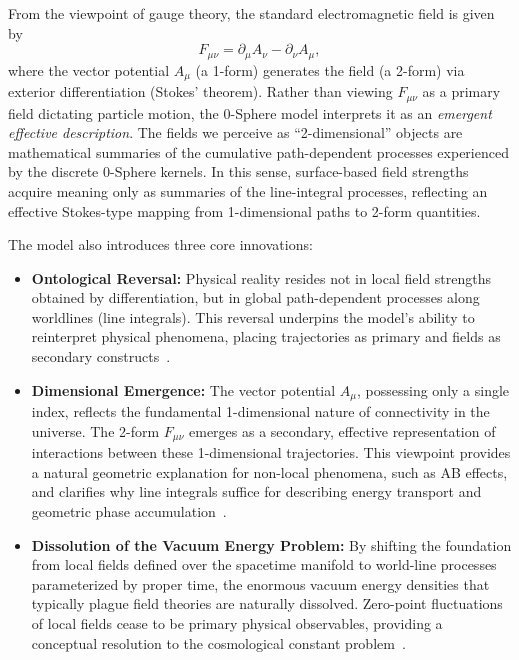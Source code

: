 \documentclass[%
 reprint,
 amsmath,amssymb,
 aps,
 prb,
]{revtex4-2}
\numberwithin{equation}{section}
\begin{document}
From the viewpoint of gauge theory, the standard electromagnetic field is given by
\begin{equation}
F_{\mu\nu} = \partial_\mu A_\nu - \partial_\nu A_\mu,
\end{equation}
where the vector potential $A_\mu$ (a 1-form) generates the field (a 2-form) via exterior differentiation (Stokes' theorem). 
Rather than viewing $F_{\mu\nu}$ as a primary field dictating particle motion, the 0-Sphere model interprets it as an \emph{emergent effective description}. 
The fields we perceive as ``2-dimensional'' objects are mathematical summaries of the cumulative path-dependent processes experienced by the discrete 0-Sphere kernels. 
In this sense, surface-based field strengths acquire meaning only as summaries of the line-integral processes, reflecting an effective Stokes-type mapping from 1-dimensional paths to 2-form quantities.

\medskip
The model also introduces three core innovations:

\begin{itemize}
    \item \textbf{Ontological Reversal:} Physical reality resides not in local field strengths obtained by differentiation, but in global path-dependent processes along worldlines (line integrals). 
    This reversal underpins the model’s ability to reinterpret physical phenomena, placing trajectories as primary and fields as secondary constructs~\cite{hanamura18135855}.

    \item \textbf{Dimensional Emergence:} The vector potential $A_\mu$, possessing only a single index, reflects the fundamental 1-dimensional nature of connectivity in the universe. 
    The 2-form $F_{\mu\nu}$ emerges as a secondary, effective representation of interactions between these 1-dimensional trajectories. 
    This viewpoint provides a natural geometric explanation for non-local phenomena, such as AB effects, and clarifies why line integrals suffice for describing energy transport and geometric phase accumulation~\cite{hanamura18203433}.
        
    \item \textbf{Dissolution of the Vacuum Energy Problem:} By shifting the foundation from local fields defined over the spacetime manifold to world-line processes parameterized by proper time, the enormous vacuum energy densities that typically plague field theories are naturally dissolved. 
    Zero-point fluctuations of local fields cease to be primary physical observables, providing a conceptual resolution to the cosmological constant problem~\cite{hanamura18275142}.
    
\end{itemize}
\end{document}
